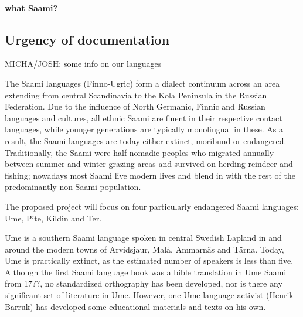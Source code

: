 \documentclass[a4paper,12pt]{article}
\begin{document}
\paragraph{what Saami?}

\subsection{Urgency of documentation}
MICHA/JOSH: some info on our languages  

The Saami languages (Finno-Ugric) form a dialect continuum across an area extending from central Scandinavia to the Kola Peninsula in the Russian Federation. Due to the influence of North Germanic, Finnic and Russian languages and cultures, all ethnic Saami are fluent in their respective contact languages, while younger generations are typically monolingual in these. As a result, the Saami languages are today either extinct, moribund or endangered. Traditionally, the Saami were half-nomadic peoples who migrated annually between summer and winter grazing areas and survived on herding reindeer and fishing; nowadays most Saami live modern lives and blend in with the rest of the predominantly non-Saami population.

The proposed project will focus on four particularly endangered Saami languages: Ume, Pite, Kildin and Ter.

Ume is a southern Saami language spoken in central Swedish Lapland in and around the modern towns of Arvidsjaur, Malå, Ammarnäs and Tärna. Today, Ume is practically extinct, as the estimated number of speakers is less than five. %
Although the first Saami language book was a bible translation in Ume Saami from 17??, %
no standardized orthography has been developed, nor is there any significant set of literature in Ume. However, one Ume language activist (Henrik Barruk) has developed some educational materials and texts on his own.
\end{document}
